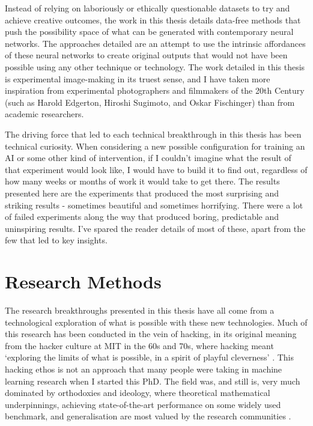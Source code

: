 Instead of relying on laboriously or ethically questionable datasets to try and achieve creative outcomes, the work in this thesis details data-free methods that push the possibility space of what can be generated with contemporary neural networks.
The approaches detailed are an attempt to use the intrinsic affordances of these neural networks to create original outputs that would not have been possible using any other technique or technology. 
The work detailed in this thesis is experimental image-making in its truest sense, and I have taken more inspiration from experimental photographers and filmmakers of the 20th Century (such as Harold Edgerton, Hiroshi Sugimoto, and Oskar Fischinger) than from academic researchers.

The driving force that led to each technical breakthrough in this thesis has been technical curiosity. 
When considering a new possible configuration for training an AI or some other kind of intervention, if I couldn’t imagine what the result of that experiment would look like, I would have to build it to find out, regardless of how many weeks or months of work it would take to get there. 
The results presented here are the experiments that produced the most surprising and striking results - sometimes beautiful and sometimes horrifying. 
There were a lot of failed experiments along the way that produced boring, predictable and uninspiring results. 
I’ve spared the reader details of most of these, apart from the few that led to key insights.

\section{Research Methods}

The research breakthroughs presented in this thesis have all come from a technological exploration of what is possible with these new technologies. Much of this research has been conducted in the vein of hacking, in its original meaning from the hacker culture at MIT in the 60s and 70s, where hacking meant `exploring the limits of what is possible, in a spirit of playful cleverness' \citep{stallman2002hacking}. 
This hacking ethos is not an approach that many people were taking in machine learning research when I started this PhD. 
The field was, and still is, very much dominated by orthodoxies and ideology, where theoretical mathematical underpinnings, achieving state-of-the-art performance on some widely used benchmark, and generalisation are most valued by the research communities \citep{birhane2022values}.

